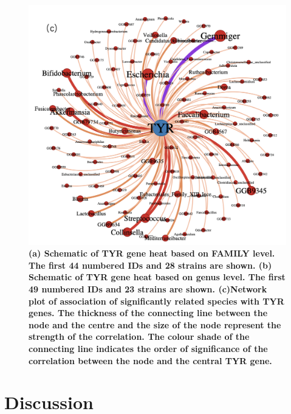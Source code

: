 \documentclass[12pt]{article}
\begin{document}
\begin{figure}[H]
    \centering
     \includegraphics[width=1\linewidth]{pic/connection.png} 
     \caption{\small\bfseries (a) Schematic of TYR gene heat based on FAMILY level. The first 44 numbered IDs and 28 strains are shown. (b) Schematic of TYR gene heat based on genus level. The first 49 numbered IDs and 23 strains are shown. (c)Network plot of association of significantly related species with TYR genes. The thickness of the connecting line between the node and the centre and the size of the node represent the strength of the correlation. The colour shade of the connecting line indicates the order of significance of the correlation between the node and the central TYR gene.}
\end{figure}

\section{Discussion}
\end{document}
